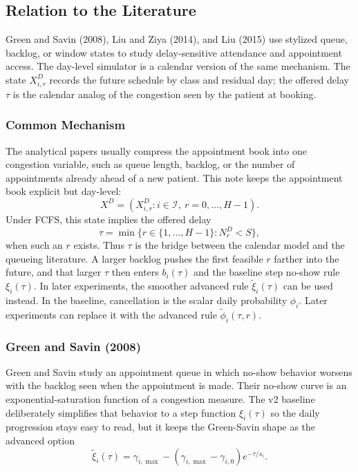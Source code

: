 \documentclass[11pt]{article}
\begin{document}
\subsection{Relation to the Literature}

Green and Savin (2008), Liu and Ziya (2014), and Liu (2015) use stylized queue, backlog, or window
states to study delay-sensitive attendance and appointment access. The day-level simulator is a
calendar version of the same mechanism. The state \(X_{i,r}^{D}\) records the future schedule by
class and residual day; the offered delay \(\tau\) is the calendar analog of the congestion seen by
the patient at booking.

\subsubsection{Common Mechanism}

The analytical papers usually compress the appointment book into one congestion variable, such as
queue length, backlog, or the number of appointments already ahead of a new patient. This note keeps
the appointment book explicit but day-level:
\[
X^D=\left(X_{i,r}^{D}:i\in\mathcal I,\ r=0,\dots,H-1\right).
\]
Under FCFS, this state implies the offered delay
\[
\tau
=
\min\{r\in\{1,\dots,H-1\}:N_r^D<S\},
\]
when such an \(r\) exists. Thus \(\tau\) is the bridge between the calendar model and the queueing
literature. A larger backlog pushes the first feasible \(r\) farther into the future, and that
larger \(\tau\) then enters \(b_i(\tau)\) and the baseline step no-show rule \(\xi_i(\tau)\). In
later experiments, the smoother advanced rule \(\tilde{\xi}_i(\tau)\) can be used instead. In the
baseline, cancellation is the scalar daily probability \(\phi_i\). Later experiments can replace it
with the advanced rule \(\tilde{\phi}_i(\tau,r)\).

\subsubsection{Green and Savin (2008)}

Green and Savin study an appointment queue in which no-show behavior worsens with the backlog seen
when the appointment is made. Their no-show curve is an exponential-saturation function of a
congestion measure. The v2 baseline deliberately simplifies that behavior to a step function
\(\xi_i(\tau)\) so the daily progression stays easy to read, but it keeps the Green-Savin shape as
the advanced option
\[
\tilde{\xi}_i(\tau)
=
\gamma_{i,\max}
-
(\gamma_{i,\max}-\gamma_{i,0})e^{-\tau/s_i}.
\]
\end{document}
